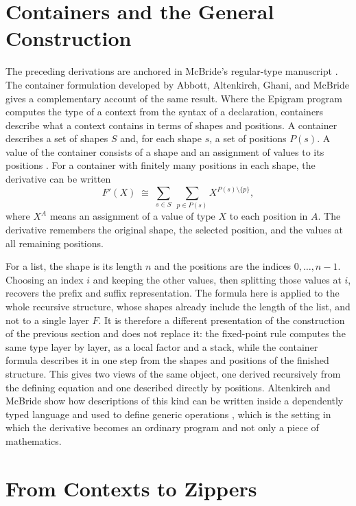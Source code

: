 \documentclass[11pt]{article}
\begin{document}
\section{Containers and the General Construction}

The preceding derivations are anchored in McBride's regular-type manuscript \cite{mcbride2001}. The container formulation developed by Abbott, Altenkirch, Ghani, and McBride \cite{derivcont2003,partial2005} gives a complementary account of the same result. Where the Epigram program computes the type of a context from the syntax of a declaration, containers describe what a context contains in terms of shapes and positions. A container describes a set of shapes $S$ and, for each shape $s$, a set of positions $P(s)$. A value of the container consists of a shape and an assignment of values to its positions \cite{aag2005}. For a container with finitely many positions in each shape, the derivative can be written
\[
F'(X)\;\cong\;
\sum_{s\in S}\ \sum_{p\in P(s)}
X^{P(s)\setminus\{p\}},
\]
where $X^A$ means an assignment of a value of type $X$ to each position in $A$. The derivative remembers the original shape, the selected position, and the values at all remaining positions.

For a list, the shape is its length $n$ and the positions are the indices $0,\dots,n-1$. Choosing an index $i$ and keeping the other values, then splitting those values at $i$, recovers the prefix and suffix representation. The formula here is applied to the whole recursive structure, whose shapes already include the length of the list, and not to a single layer $F$. It is therefore a different presentation of the construction of the previous section and does not replace it: the fixed-point rule computes the same type layer by layer, as a local factor and a stack, while the container formula describes it in one step from the shapes and positions of the finished structure. This gives two views of the same object, one derived recursively from the defining equation and one described directly by positions. Altenkirch and McBride show how descriptions of this kind can be written inside a dependently typed language and used to define generic operations \cite{altenkirchmcbride2003}, which is the setting in which the derivative becomes an ordinary program and not only a piece of mathematics.

\section{From Contexts to Zippers}
\end{document}
